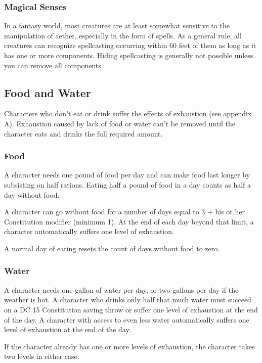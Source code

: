 \subsubsection{Magical Senses}
In a fantasy world, most creatures are at least somewhat sensitive to the manipulation of aether, especially in the form of spells. As a general rule, all creatures can recognize spellcasting occurring within 60 feet of them as long as it has one or more components. Hiding spellcasting is generally not possible unless you can remove all components.

\subsection{Food and Water}

Characters who don't eat or drink suffer the effects of exhaustion (see appendix A). Exhaustion caused by lack of food or water can't be removed until the character eats and drinks the full required amount.

\subsubsection{Food}

A character needs one pound of food per day and can make food last longer by subsisting on half rations. Eating half a pound of food in a day counts as half a day without food.

A character can go without food for a number of days equal to 3 + his or her Constitution modifier (minimum 1). At the end of each day beyond that limit, a character automatically suffers one level of exhaustion.

A normal day of eating resets the count of days without food to zero.

\subsubsection{Water}

A character needs one gallon of water per day, or two gallons per day if the weather is hot. A character who drinks only half that much water must succeed on a DC 15 Constitution saving throw or suffer one level of exhaustion at the end of the day. A character with access to even less water automatically suffers one level of exhaustion at the end of the day.

If the character already has one or more levels of exhaustion, the character takes two levels in either case.

